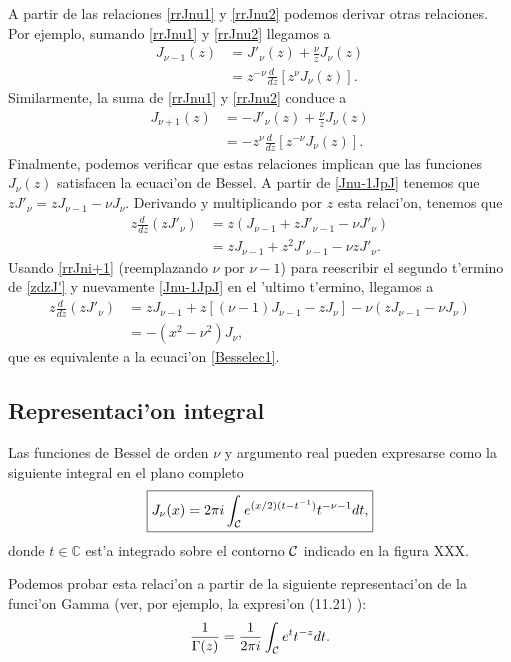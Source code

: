 A partir de las relaciones \eqref{rrJnu1} y \eqref{rrJnu2} podemos derivar otras relaciones. Por ejemplo, sumando \eqref{rrJnu1} y \eqref{rrJnu2} llegamos a
\begin{align}
J_{\nu-1}(z) &= J'_{\nu}(z)+\frac{\nu}{z}J_\nu(z) \label{Jnu-1JpJ}\\
&= z^{-\nu}\frac{d\ }{dz}\left[z^\nu J_\nu(z)\right]. \label{Jnu-1JpJ2}
\end{align}
Similarmente, la suma de \eqref{rrJnu1} y \eqref{rrJnu2} conduce a 
\begin{align}
J_{\nu+1}(z) &= -J'_{\nu}(z)+\frac{\nu}{z}J_\nu(z) \label{rrJni+1} \\
&= -z^{\nu}\frac{d\ }{dz}\left[z^{-\nu} J_\nu(z)\right]. \label{rrJni+2}
\end{align}
Finalmente, podemos verificar que estas relaciones implican que las funciones $J_\nu(z)$ satisfacen la ecuaci'on de Bessel. A partir de \eqref{Jnu-1JpJ} tenemos que $zJ'_\nu=zJ_{\nu-1}-\nu J_\nu$. Derivando y multiplicando por $z$ esta relaci'on, tenemos que
\begin{align}
z\frac{d\ }{dz}(zJ'_\nu) &= z\left(J_{\nu-1}+zJ'_{\nu-1}-\nu J'_\nu\right)\\
&= zJ_{\nu-1}+z^2J'_{\nu-1}-\nu zJ'_\nu. \label{zdzJ'}
\end{align}
Usando \eqref{rrJni+1} (reemplazando $\nu$ por $\nu-1$) para reescribir el segundo t'ermino de \eqref{zdzJ'} y nuevamente \eqref{Jnu-1JpJ} en el 'ultimo t'ermino, llegamos a
\begin{align}
z\frac{d\ }{dz}(zJ'_\nu) &= zJ_{\nu-1}+z\left[(\nu-1)J_{\nu-1}-zJ_\nu\right]-\nu (zJ_{\nu-1}-\nu J_\nu) \\
&= -(x^2-\nu^2) J_\nu,
\end{align}
que es equivalente a la ecuaci'on \eqref{Besselec1}.

\subsection{Representaci'on integral}
Las funciones de Bessel de orden $\nu$ y argumento real pueden expresarse como la siguiente integral en el plano completo
\begin{equation}\label{RIJnu}
\boxed{J_\nu(x)=2\pi i\int_{\cal C}e^{(x/2)(t-t^{-1})}t^{-\nu-1}dt,}
\end{equation}
donde $t\in\mathbb{C}$ est'a integrado sobre el contorno $\cal C$ indicado en la figura XXX.

Podemos probar esta relaci'on a partir de la siguiente representaci'on de la funci'on Gamma (ver, por ejemplo, la expresi'on (11.21) \cite{Hassani}):
\begin{equation}\label{1sGint}
\frac{1}{\Gamma(z)}=\frac{1}{2\pi i}\int_{\cal C}e^t t^{-z}dt.
\end{equation}

